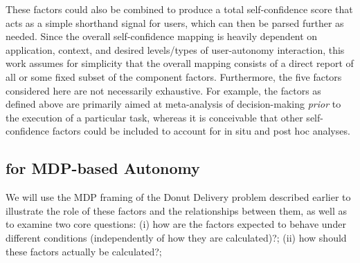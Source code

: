 These factors could also be combined to produce a total self-confidence score that acts as a simple shorthand signal for users, which can then be parsed further as needed. 
Since the overall self-confidence mapping is heavily dependent on application, context, and desired levels/types of user-autonomy interaction, this work assumes for simplicity that the overall mapping consists of a direct report of all or some fixed subset of the component factors. %
Furthermore, the five factors considered here are not necessarily exhaustive. For example, the factors as defined above are primarily aimed at meta-analysis of decision-making \emph{prior} to the execution of a particular task, whereas it is conceivable that other self-confidence factors could be included to account for in situ and post hoc analyses. %

\subsection{\famsec{} for MDP-based Autonomy} 
We will use the MDP framing of the Donut Delivery problem described earlier to illustrate the role of these factors and the relationships between them, as well as to examine two core questions: (i) how are the factors expected to behave under different conditions (independently of how they are calculated)?; (ii) how should these factors actually be calculated?; %

